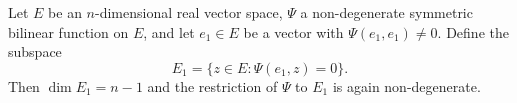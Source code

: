 Let $E$ be an $n$-dimensional real vector space, $\Psi$ a non-degenerate symmetric bilinear function on $E$, and let $e_1 \in E$ be a vector with $\Psi(e_1, e_1) \neq 0$. Define the subspace
$$E_1 = \{ z \in E : \Psi(e_1, z) = 0 \}.$$
Then $\dim E_1 = n - 1$ and the restriction of $\Psi$ to $E_1$ is again non-degenerate.
